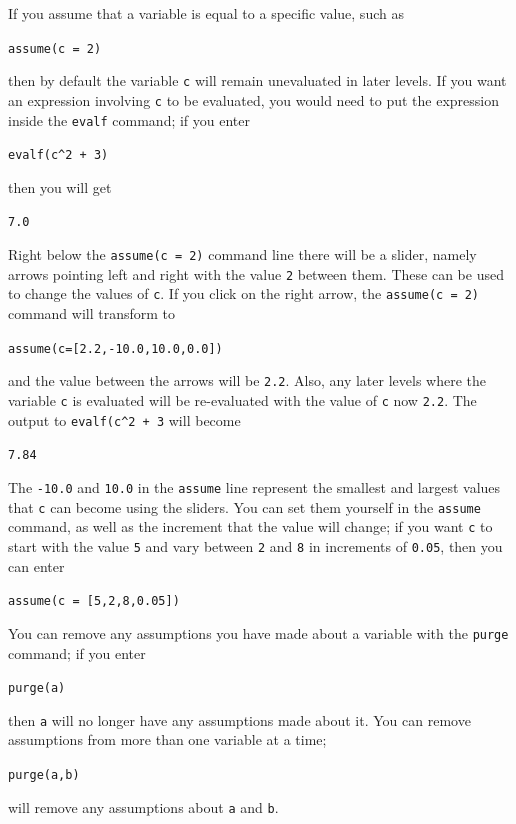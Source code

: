 \documentclass[a4paper,11pt]{book}
\begin{document}
If you assume that a variable is equal to a specific value, such as
\begin{center}
  {\tt assume(c = 2)}
\end{center}
then by default the variable \texttt{c} will remain unevaluated in
later levels.  If you want an expression involving \texttt{c} to be
evaluated, you would need to put the expression inside the
\texttt{evalf} command; if you enter
\begin{center}
  {\tt evalf(c\^{}2 + 3)}
\end{center}
then you will get 
\begin{center}
  {\tt 7.0}
\end{center}
Right below the \texttt{assume(c = 2)} command line
there will be a slider, namely arrows pointing left and right with the
value \texttt{2} between them.  These
can be used to change the values of \texttt{c}.  If you click on the
right arrow, the \texttt{assume(c = 2)} command will transform to
\begin{center}
  {\tt assume(c=[2.2,-10.0,10.0,0.0])}
\end{center}
and the value between the arrows will be \texttt{2.2}.  Also, any
later levels where the variable \texttt{c} is evaluated will be
re-evaluated with the value of \texttt{c} now \texttt{2.2}.  The
output to \texttt{evalf(c\^{}2 + 3} will become
\begin{center}
  {\tt 7.84}
\end{center}
The \texttt{-10.0} and \texttt{10.0} in the \texttt{assume} line
represent the smallest and largest values that \texttt{c} can become
using the sliders.  You can set them yourself in the \texttt{assume}
command, as well as the increment that the value will change; if you
want \texttt{c} to start with the value \texttt{5} and vary between
\texttt{2} and \texttt{8} in increments of \texttt{0.05}, then you can
enter
\begin{center}
  {\tt assume(c = [5,2,8,0.05])}
\end{center}

You can remove any assumptions you have made about a variable with the
\texttt{purge} command; if you enter
\begin{center}
  {\tt purge(a)}
\end{center}
then \texttt{a} will no longer have any assumptions made about it.
You can remove assumptions from more than one variable at a time;
\begin{center}
  {\tt purge(a,b)}
\end{center}
will remove any assumptions about \texttt{a} and \texttt{b}.
\end{document}
